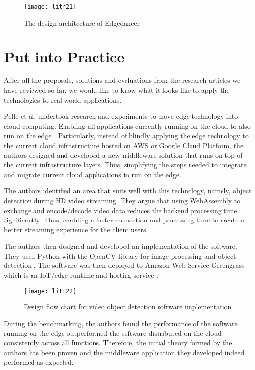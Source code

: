 \bigskip
\begin{figure}[hp]
\centering
\texttt{[image: litr21]}
\caption{\footnotesize{The design architecture of Edgedancer \cite{lit37}}}
\captionsetup{aboveskip=0pt,font=it}
\end{figure}
\bigskip

\bigskip
\section{Put into Practice}

After all the proposals, solutions and evaluations from the research articles we have reviewed so far, we would like to know what it looks like to apply the technologies to real-world applications.

Pelle et al. undertook research and experiments to move edge technology into cloud computing. Enabling all applications currently running on the cloud to also run on the edge \cite{lit38}. Particularly, instead of blindly applying the edge technology to the current cloud infrastructure hosted on AWS or Google Cloud Platform, the authors designed and developed a new middleware solution that runs on top of the current infrastructure layers. Thus, simplifying the steps needed to integrate and migrate current cloud applications to run on the edge.

The authors identified an area that suits well with this technology, namely, object detection during HD video streaming. They argue that using WebAssembly to exchange and encode/decode video data reduces the backend processing time significantly. Thus, enabling a faster connection and processing time to create a better streaming experience for the client users.

The authors then designed and developed an implementation of the software. They used Python with the OpenCV library for image processing and object detection \cite{lit39}. The software was then deployed to Amazon Web Service Greengrass which is an IoT/edge runtime and hosting service \cite{lit40}.

\begin{figure}[hp]
\centering
\texttt{[image: litr22]}
\caption{\footnotesize{Design flow chart for video object detection software implementation \cite{lit38}}}
\captionsetup{aboveskip=0pt,font=it}
\end{figure}
\bigskip

During the benchmarking, the authors found the performance of the software running on the edge outperformed the software distributed on the cloud consistently across all functions. Therefore, the initial theory formed by the authors has been proven and the middleware application they developed indeed performed as expected.

